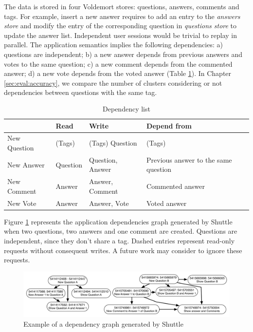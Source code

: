 The data is stored in four Voldemort stores: questions, answers, comments and tags. For example, insert a new answer requires to add an entry to the \textit{answers store} and modify the entry of the corresponding question in \textit{questions store} to update the answer list. 
Independent user sessions would be trivial to replay in parallel. The application semantics implies the following dependencies: a) questions are independent; b) a new answer depends from previous answers and votes to the same question; c) a new comment depends from the commented answer; d) a new vote depends from the voted answer (Table \ref{tab:dependencyTable}). In Chapter \ref{sec:eval:accuracy}, we compare the number of clusters considering or not dependencies between questions with the same tag.
\begin{table}
  \centering
   \begin{tabular}{|l|l|l|l|}
    \hline
    ~             & Read           	& Write           	& Depend from                               \\ \hline
    New Question  & (Tags)          & (Tags) Question  & (Tags)                                     \\ \hline
    New Answer    & Question        & Question, Answer & Previous answer to the same question   \\ \hline
    New Comment   & Answer          & Answer, Comment  & Commented answer                           \\ \hline
    New Vote      & Answer          & Answer, Vote     & Voted answer                               \\ \hline
    \end{tabular}
    \caption{Dependency list}
    \label{tab:dependencyTable}
\end{table}

Figure \ref{fig:dependencyGraph} represents the application dependencies graph generated by Shuttle when two questions, two answers and one comment are created. Questions are independent, since they don't share a tag. Dashed entries represent read-only requests without consequent writes. A future work may consider to ignore these requests.

\begin{figure}
  \centering
  \includegraphics[width=150mm]{images/dependencyGraph}
  \caption{Example of a dependency graph generated by Shuttle}
  \label{fig:dependencyGraph}
\end{figure}

